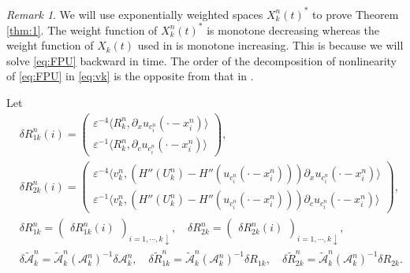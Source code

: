\documentclass[11pt]{amsart}
\theoremstyle{remark}
\newtheorem{remark}{Remark}[section]
\numberwithin{equation}{section}
\begin{document}
\begin{remark}
We  will use exponentially weighted spaces $X_k^n(t)^*$
to prove Theorem \ref{thm:1}.
The weight function of $X_k^n(t)^*$ is monotone decreasing whereas the weight
function of $X_k(t)$ used in \cite{Mi2} is monotone increasing. 
This is because we will solve \eqref{eq:FPU} backward in time.
The order of the decomposition of nonlinearity of \eqref{eq:FPU}
in \eqref{eq:vk} is the opposite from that in \cite[(2.6)]{Mi2}.
\end{remark}

Let
\begin{align*}
& \delta R_{1k}^n(i)=
\begin{pmatrix}{\varepsilon}^{-4}{\langle} R_k^n,{\partial}_xu_{c_i^n}(\cdot-x_i^n){\rangle}
\\ {\varepsilon}^{-1}{\langle} R_k^n, {\partial}_cu_{c_i^n}(\cdot-x_i^n){\rangle}\end{pmatrix},
\\
&  \delta R_{2k}^n(i)=
\begin{pmatrix} {\varepsilon}^{-4}{\langle} v_k^n,
(H''(U_k^n)-H''(u_{c_i^n}(\cdot-x_i^n))){\partial}_xu_{c_i^n}(\cdot-x_i^n){\rangle}
\\ {\varepsilon}^{-1}{\langle} v_k^n,
(H''(U_k^n)-H''(u_{c_i^n}(\cdot-x_i^n))){\partial}_cu_{c_i^n}(\cdot-x_i^n){\rangle}
\end{pmatrix},
\\ & 
\delta R_{1k}^n=
\begin{pmatrix}\delta R_{1k}^n(i)\end{pmatrix}_{i=1,\cdots,k\downarrow},\quad
\delta R_{2k}^n=
\begin{pmatrix}\delta R_{2k}^n(i)\end{pmatrix}_{i=1,\cdots,k\downarrow},
\\ &
\delta\widetilde{\mathcal{A}}_k^n
=\widetilde{\mathcal{A}}_k^n(\mathcal{A}_k^n)^{-1}\delta\mathcal{A}_k^n,
\quad 
\delta{\widetilde{R}}_{1k}^n=\widetilde{\mathcal{A}}_k^n(\mathcal{A}_k^n)^{-1}\delta R_{1k},
\quad
\delta{\widetilde{R}}_{2k}^n=\widetilde{\mathcal{A}}_k^n(\mathcal{A}_k^n)^{-1}\delta R_{2k}.
\end{align*}
\end{document}

